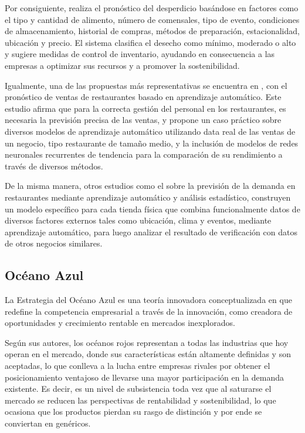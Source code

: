 Por consiguiente, realiza el pronóstico del desperdicio basándose en factores como el tipo y cantidad de alimento, número de comensales, tipo de evento, condiciones de almacenamiento, historial de compras, métodos de preparación, estacionalidad, ubicación y precio. El sistema clasifica el desecho como mínimo, moderado o alto y sugiere medidas de control de inventario, ayudando en consecuencia a las empresas a optimizar sus recursos y a promover la sostenibilidad. 

Igualmente, una de las propuestas más representativas se encuentra en \parencite{schmidt2022mlsales}, con el pronóstico de ventas de restaurantes basado en aprendizaje automático. Este estudio afirma que para la correcta gestión del personal en los restaurantes, es necesaria la previsión precisa de las ventas, y propone un caso práctico sobre diversos modelos de aprendizaje automático utilizando data real de las ventas de un negocio, tipo restaurante de tamaño medio, y la inclusión de modelos de redes neuronales recurrentes de tendencia para la comparación de su rendimiento a través de diversos métodos.

De la misma manera, otros estudios como el \parencite{tanizaki2019forecasting} sobre la previsión de la demanda en restaurantes mediante aprendizaje automático y análisis estadístico, construyen un modelo específico para cada tienda física que combina funcionalmente datos de diversos factores externos tales como ubicación, clima y eventos, mediante aprendizaje automático, para luego analizar el resultado de verificación con datos de otros negocios similares.

\subsection{Océano Azul}

La Estrategia del Océano Azul es una teoría innovadora conceptualizada en \parencite{kim2015estrategia} que redefine la competencia empresarial a través de la innovación, como creadora de oportunidades y crecimiento rentable en mercados inexplorados.

Según sus autores, los océanos rojos representan a todas las industrias que hoy operan en el mercado, donde sus características están altamente definidas y son aceptadas, lo que conlleva a la lucha entre empresas rivales por obtener el posicionamiento ventajoso de llevarse una mayor participación en la demanda existente. Es decir, es un nivel de subsistencia toda vez que al saturarse el mercado se reducen las perspectivas de rentabilidad y sostenibilidad, lo que ocasiona que los productos pierdan su rasgo de distinción y por ende se conviertan en genéricos.

